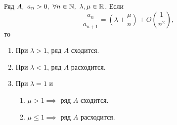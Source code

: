 \begin{theorem}
    Ряд $A, \ a_n > 0, \ \forall n \in \N, \ \lambda, \mu \in \R$. Если
    \[
        \frac{a_n}{a_{n+1}} = \left(\lambda + \frac{\mu}{n}\right) + O\left(\frac{1}{n^2}\right),
    \]
    то
    \begin{enumerate}
        \item При $\lambda > 1$, ряд $A$ сходится.
        \item При $\lambda < 1$, ряд $A$ расходится.
        \item При $\lambda = 1$ и \begin{enumerate}
                  \item $\mu > 1 \implies$ ряд $A$ сходится.
                  \item $\mu \leqslant 1 \implies$ ряд $A$ расходится.
              \end{enumerate}
    \end{enumerate}
\end{theorem}


